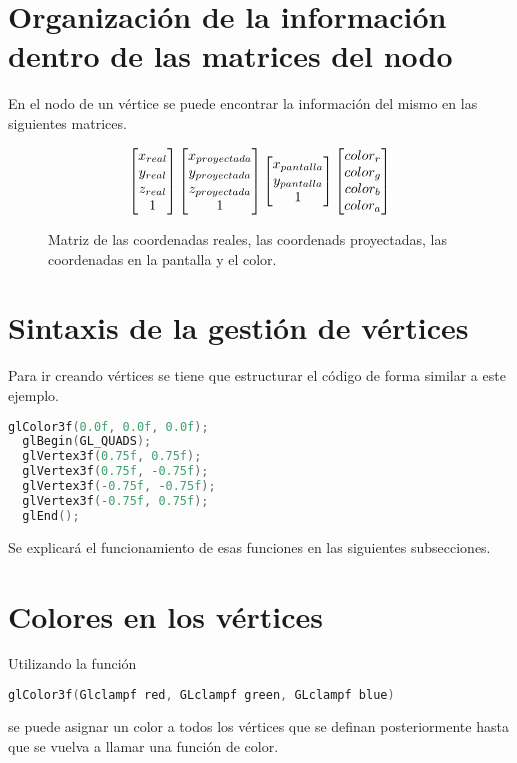 \section{Organización de la información dentro de las matrices del nodo}
En el nodo de un vértice se puede encontrar la información del mismo en las siguientes matrices.
\begin{figure}[ht]
  \[
  \centering
  \begin{bmatrix}
    x_{real} \\
    y_{real} \\
    z_{real}  \\
    1 
  \end{bmatrix}
  \begin{bmatrix}
    x_{proyectada} \\
    y_{proyectada} \\
    z_{proyectada} \\
    1
  \end{bmatrix}
  \begin{bmatrix}
    x_{pantalla} \\
    y_{pantalla} \\
    1
  \end{bmatrix}
  \begin{bmatrix}
    color_r \\
    color_g \\
    color_b \\
    color_a
  \end{bmatrix}
  \]
  \caption{Matriz de las coordenadas reales, las coordenads proyectadas, las coordenadas en la pantalla y el color.}
\end{figure}
\section{Sintaxis de la gestión de vértices}
Para ir creando vértices se tiene que estructurar el código de forma similar a este ejemplo.
\begin{lstlisting}[language=C]
  glColor3f(0.0f, 0.0f, 0.0f);
  glBegin(GL_QUADS);
  glVertex3f(0.75f, 0.75f);
  glVertex3f(0.75f, -0.75f);
  glVertex3f(-0.75f, -0.75f);
  glVertex3f(-0.75f, 0.75f);
  glEnd();
\end{lstlisting}
Se explicará el funcionamiento de esas funciones en las siguientes subsecciones.
\section{Colores en los vértices}
Utilizando la función
\begin{lstlisting}[language=C]
  glColor3f(Glclampf red, GLclampf green, GLclampf blue)
\end{lstlisting}
se puede asignar un color a todos los vértices que se definan posteriormente hasta que se vuelva a llamar una función de color.
